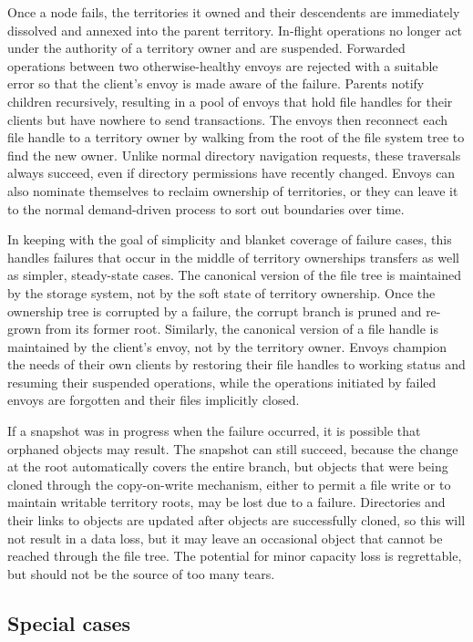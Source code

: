 Once a node fails, the territories it owned and their descendents are immediately dissolved and annexed into the parent territory. In-flight operations no longer act under the authority of a territory owner and are suspended. Forwarded operations between two otherwise-healthy envoys are rejected with a suitable error so that the client's envoy is made aware of the failure. Parents notify children recursively, resulting in a pool of envoys that hold file handles for their clients but have nowhere to send transactions. The envoys then reconnect each file handle to a territory owner by walking from the root of the file system tree to find the new owner. Unlike normal directory navigation requests, these traversals always succeed, even if directory permissions have recently changed. Envoys can also nominate themselves to reclaim ownership of territories, or they can leave it to the normal demand-driven process to sort out boundaries over time.

In keeping with the goal of simplicity and blanket coverage of failure cases, this handles failures that occur in the middle of territory ownerships transfers as well as simpler, steady-state cases. The canonical version of the file tree is maintained by the storage system, not by the soft state of territory ownership. Once the ownership tree is corrupted by a failure, the corrupt branch is pruned and re-grown from its former root. Similarly, the canonical version of a file handle is maintained by the client's envoy, not by the territory owner. Envoys champion the needs of their own clients by restoring their file handles to working status and resuming their suspended operations, while the operations initiated by failed envoys are forgotten and their files implicitly closed.

If a snapshot was in progress when the failure occurred, it is possible that orphaned objects may result. The snapshot can still succeed, because the change at the root automatically covers the entire branch, but objects that were being cloned through the copy-on-write mechanism, either to permit a file write or to maintain writable territory roots, may be lost due to a failure. Directories and their links to objects are updated after objects are successfully cloned, so this will not result in a data loss, but it may leave an occasional object that cannot be reached through the file tree. The potential for minor capacity loss is regrettable, but should not be the source of too many tears.

\subsection{Special cases}

